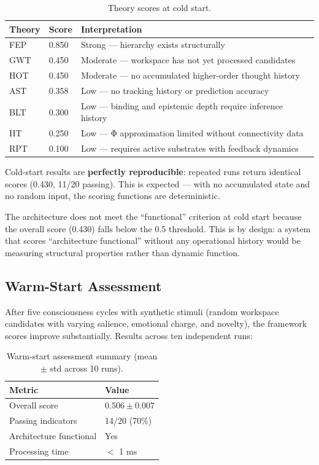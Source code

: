 \begin{table}[t]
\centering
\small
\begin{tabular}{llp{8cm}}
\toprule
Theory & Score & Interpretation \\
\midrule
FEP & 0.850 & Strong --- hierarchy exists structurally \\
GWT & 0.450 & Moderate --- workspace has not yet processed candidates \\
HOT & 0.450 & Moderate --- no accumulated higher-order thought history \\
AST & 0.358 & Low --- no tracking history or prediction accuracy \\
BLT & 0.300 & Low --- binding and epistemic depth require inference history \\
IIT & 0.250 & Low --- Φ approximation limited without connectivity data \\
RPT & 0.100 & Low --- requires active substrates with feedback dynamics \\
\bottomrule
\end{tabular}
\caption{Theory scores at cold start.}
\label{tab:cold-start-theory}
\end{table}

Cold-start results are \textbf{perfectly reproducible}: repeated runs return identical scores (0.430, 11/20 passing). This is expected --- with no accumulated state and no random input, the scoring functions are deterministic.

The architecture does not meet the ``functional'' criterion at cold start because the overall score (0.430) falls below the 0.5 threshold. This is by design: a system that scores ``architecture functional'' without any operational history would be measuring structural properties rather than dynamic function.

\subsection{Warm-Start Assessment}
\label{sec:warm-start}

After five consciousness cycles with synthetic stimuli (random workspace candidates with varying salience, emotional charge, and novelty), the framework scores improve substantially. Results across ten independent runs:

\begin{table}[t]
\centering
\begin{tabular}{ll}
\toprule
Metric & Value \\
\midrule
Overall score & $0.506 \pm 0.007$ \\
Passing indicators & 14/20 (70\%) \\
Architecture functional & Yes \\
Processing time & $<$ 1 ms \\
\bottomrule
\end{tabular}
\caption{Warm-start assessment summary (mean $\pm$ std across 10 runs).}
\label{tab:warm-start-summary}
\end{table}


